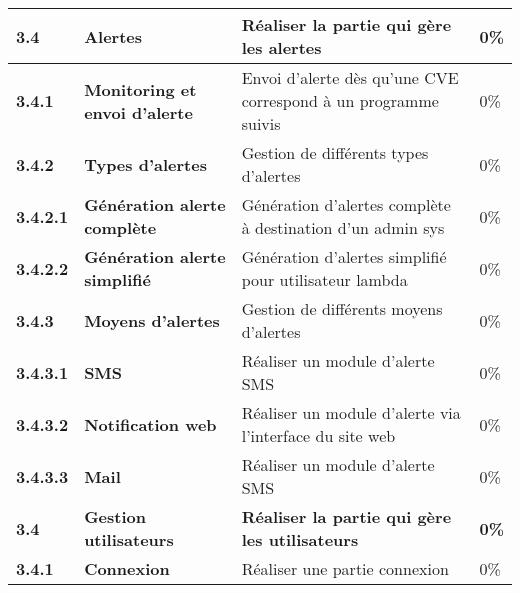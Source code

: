 \begin{supertabular}{|p{2.2cm} p{6cm}|p{5cm}|R{2cm}|}
  \textbf{3.4}  & \textbf{Alertes} & \textbf{Réaliser la partie qui gère les alertes} & \textbf{0\%} \\
  \hline

  \hspace{6pt}
  \textbf{3.4.1}  & \textbf{Monitoring et envoi d'alerte} & Envoi d'alerte dès qu'une CVE correspond à un programme suivis  & 0\% \\
  \hline

  \hspace{6pt}
  \textbf{3.4.2}  & \textbf{Types d'alertes} & Gestion de différents types d'alertes  & 0\% \\
  \hline

  \hspace{12pt}
  \textbf{3.4.2.1}  & \textbf{Génération alerte complète} & Génération d'alertes complète à destination d'un admin sys & 0\% \\
  \hline

  \hspace{12pt}
  \textbf{3.4.2.2}  & \textbf{Génération alerte simplifié} & Génération d'alertes simplifié pour utilisateur lambda  & 0\% \\
  \hline

  \hspace{6pt}
  \textbf{3.4.3}  & \textbf{Moyens d'alertes} & Gestion de différents moyens d'alertes  & 0\% \\
  \hline


  \hspace{12pt}
  \textbf{3.4.3.1}  & \textbf{SMS} & Réaliser un module d'alerte SMS  & 0\% \\
  \hline

  \hspace{12pt}
  \textbf{3.4.3.2}  & \textbf{Notification web} & Réaliser un module d'alerte via l'interface du site web & 0\% \\
  \hline

  \hspace{12pt}
  \textbf{3.4.3.3}  & \textbf{Mail} & Réaliser un module d'alerte SMS & 0\% \\
  \hline






  \textbf{3.4}  & \textbf{Gestion utilisateurs} & \textbf{Réaliser la partie qui gère les utilisateurs} & \textbf{0\%} \\
  \hline

  \hspace{6pt}
  \textbf{3.4.1}  & \textbf{Connexion} & Réaliser une partie connexion & 0\% \\
  \hline


\end{supertabular}
